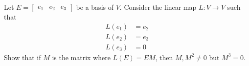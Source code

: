\begin{exercise}
  \label{ex:hw03:shift-map-powers}
  Let \(E=\begin{bmatrix}e_1&e_2&e_3\end{bmatrix}\) be a basis of
  \(V\). Consider the linear map \(L:V\to V\) such that
  \[
    \begin{aligned}
      L(e_1)&=e_2\\
      L(e_2)&=e_3\\
      L(e_3)&=0
    \end{aligned}
  \]
  Show that if \(M\) is the matrix where \(L(E)=EM\), then
  \(M,M^2\ne0\) but \(M^3=0\).
\end{exercise}
